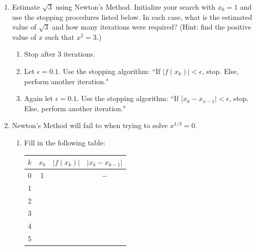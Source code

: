 \documentclass[12pt]{article}
\newif\ifans
\begin{document}
\begin{enumerate}
\begin{enumerate}
\ifans\fbox{The solution is approximately 0.671232257.}\fi

\end{enumerate}

\item Estimate $\sqrt{3}$ using Newton's Method.  Initialize your search with $x_0=1$ and use the stopping procedures listed below.  In each case, what is the estimated value of $\sqrt{3}$ and how many iterations were required?  (Hint: find the positive value of $x$ such that $x^2=3$.)

\begin{enumerate}

\item Stop after 3 iterations.

\ifans\fbox{The solution is approximately 1.732142857.}\fi

\item Let $\epsilon=0.1$.  Use the stopping algorithm: ``If $|f(x_k)|<\epsilon$, stop.  Else, perform another iteration."

\ifans\fbox{The solution is approximately 1.75 after 2 iterations.}\fi

\item Again let $\epsilon=0.1$.  Use the stopping algorithm: ``If $|x_k-x_{x-1}|<\epsilon$, stop.  Else, perform another iteration."

\ifans\fbox{The solution is approximately 1.732142857 after 3 iterations.}\fi

\end{enumerate}

\item Newton's Method will fail to when trying to solve $x^{1/3}=0$.  

\begin{enumerate}

\item Fill in the following table:
\begin{center}
\begin{tabular}{|c|c|c|c|}
\hline
$k$ & $x_k$ & $|f(x_k)|$ & $|x_k-x_{k-1}|$\\
\hline
0 & 1 & & $-$\\
\hline
1 &&&\\
\hline
2 &&&\\
\hline
3&&&\\
\hline
4 &&&\\
\hline
5 &&&\\
\hline
\end{tabular}
\end{center}


\end{enumerate}
\end{enumerate}
\end{document}
